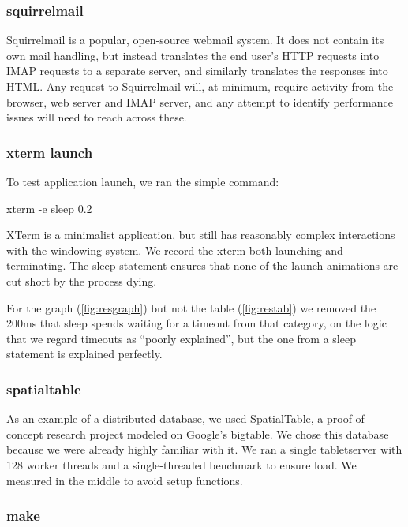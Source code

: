 \documentclass[10pt]{article}
\begin{document}
\subsubsection{squirrelmail}

Squirrelmail\cite{squirrelmail} is a popular, open-source webmail system.  It does not contain its own mail handling, but instead translates the end user's HTTP requests into IMAP requests to a separate server, and similarly translates the responses into HTML.  Any request to Squirrelmail will, at minimum, require activity from the browser, web server and IMAP server, and any attempt to identify performance issues will need to reach across these.

\subsubsection{xterm launch}

To test application launch, we ran the simple command:

\begin{tt} xterm -e sleep 0.2 \end{tt}

XTerm is a minimalist application, but still has reasonably complex interactions with the windowing system.  We record the xterm both launching and terminating.  The sleep statement ensures that none of the launch animations are cut short by the process dying.

For the graph (\ref{fig:resgraph}) but not the table (\ref{fig:restab}) we removed the 200ms that sleep spends waiting for a timeout from that category, on the logic that we regard timeouts as ``poorly explained'', but the one from a sleep statement is explained perfectly.

\subsubsection{spatialtable}

As an example of a distributed database, we used SpatialTable\cite{spatialtable}, a proof-of-concept research project modeled on Google's bigtable\cite{bigtable}.  We chose this database because we were already highly familiar with it.  We ran a single tabletserver with 128 worker threads and a single-threaded benchmark to ensure load.  We measured in the middle to avoid setup functions.

\subsubsection{make}
\end{document}
